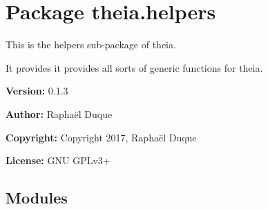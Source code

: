 %
%
%


\section{Package theia.helpers}

    \label{theia:helpers}
This is the helpers sub-package of theia.

It provides it provides all sorts of generic functions for theia.

\textbf{Version:} 0.1.3



\textbf{Author:} Raphaël Duque



\textbf{Copyright:} Copyright 2017, Raphaël Duque



\textbf{License:} GNU GPLv3+





\subsection{Modules}

